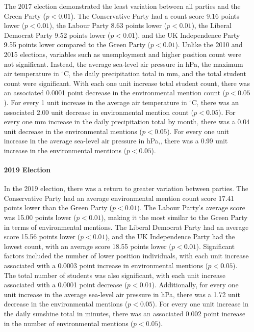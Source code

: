 \documentclass[12pt,letterpaper]{article}
\begin{document}
The 2017 election demonstrated the least variation between all parties and the Green Party ($p<0.01$). The Conservative Party had a count score 9.16 points lower ($p<0.01$), the Labour Party 8.63 points lower ($p<0.01$), the Liberal Democrat Party 9.52 points lower ($p<0.01$), and the UK Independence Party 9.55 points lower compared to the Green Party ($p<0.01$). Unlike the 2010 and 2015 elections, variables such as unemployment and higher position count were not significant. Instead, the average sea-level air pressure in hPa, the maximum air temperature in $^\circ$C, the daily precipitation total in mm, and the total student count were significant. With each one unit increase total student count, there was an associated 0.0001 point decrease in the environmental mention count ($p<0.05$). For every 1 unit increase in the average air temperature in $^\circ$C, there was an associated 2.00 unit decrease in environmental mention count ($p<0.05$). For every one mm increase in the daily precipitation total by month, there was a 0.04 unit decrease in the environmental mentions ($p<0.05$). For every one unit increase in the average sea-level air pressure in hPa,, there was a 0.99 unit increase in the environmental mentions ($p<0.05$). 

\paragraph{2019 Election}

In the 2019 election, there was a return to greater variation between parties. The Conservative Party had an average environmental mention count score 17.41 points lower than the Green Party ($p<0.01$). The Labour Party’s average score was 15.00 points lower ($p<0.01$), making it the most similar to the Green Party in terms of environmental mentions. The Liberal Democrat Party had an average score 15.56 points lower ($p<0.01$), and the UK Independence Party had the lowest count, with an average score 18.55 points lower ($p<0.01$). Significant factors included the number of lower position individuals, with each unit increase associated with a 0.0003 point increase in environmental mentions ($p<0.05$). The total number of students was also significant, with each unit increase associated with a 0.0001 point decrease ($p<0.01$). Additionally, for every one unit increase in the average sea-level air pressure in hPa, there was a 1.72 unit decrease in the environmental mentions ($p<0.05$). For every one unit increase in the daily sunshine total in minutes, there was an associated 0.002 point increase in the number of environmental mentions ($p<0.05$).
\end{document}
